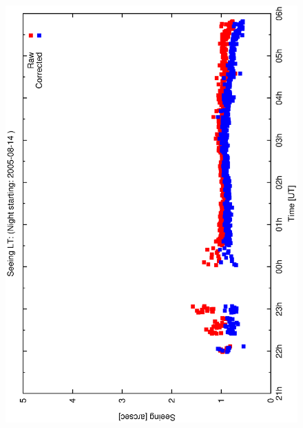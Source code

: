 {{\begin{figure}[htbp]
\begin{center}
{    \includegraphics[scale=0.25, angle=-90]{figures/ecs/see_profile_2005_08_14.eps}
    \label{fig:see_profile_2005_08_14}
  }
\end{center}
\end{figure}}}
